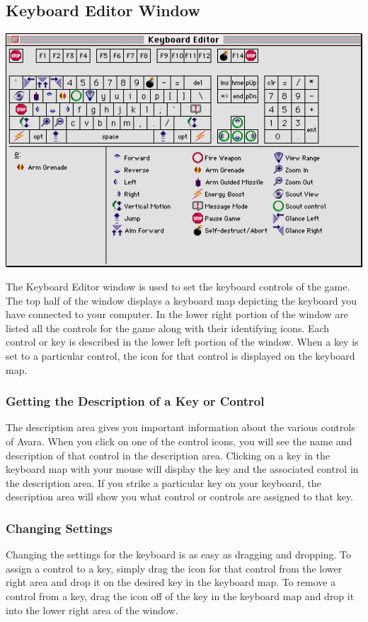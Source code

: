 \documentclass{article}
\begin{document}
\subsection{Keyboard Editor Window}
\color{black}
\begin{center}
	\includegraphics[width=\textwidth]{img/05.png}
\end{center}

The Keyboard Editor window is used to set the keyboard controls of the game. The top half of the window displays a keyboard map depicting the keyboard you have connected to your computer. In the lower right portion of the window are listed all the controls for the game along with their identifying icons. Each control or key is described in the lower left portion of the window. When a key is set to a particular control, the icon for that control is displayed on the keyboard map.

\subsubsection{Getting the Description of a Key or Control}
The description area gives you important information about the various controls of Avara. When you click on one of the control icons, you will see the name and description of that control in the description area. Clicking on a key in the keyboard map with your mouse will display the key and the associated control in the description area. If you strike a particular key on your keyboard, the description area will show you what control or controls are assigned to that key.

\subsubsection{Changing Settings}
Changing the settings for the keyboard is as easy as dragging and dropping. To assign a control to a key, simply drag the icon for that control from the lower right area and drop it on the desired key in the keyboard map. To remove a control from a key, drag the icon off of the key in the keyboard map and drop it into the lower right area of the window.
\end{document}
